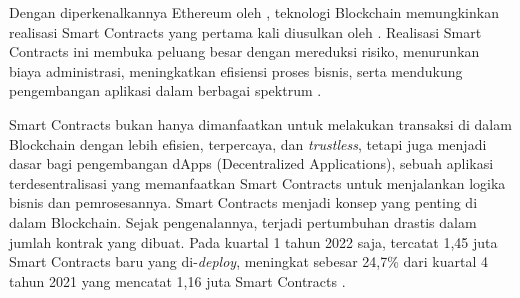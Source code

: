 Dengan diperkenalkannya Ethereum oleh \cite{buterin2013ethereum}, teknologi Blockchain memungkinkan realisasi Smart Contracts yang pertama kali diusulkan oleh \cite{szabo1997formalizing}. Realisasi Smart Contracts ini membuka peluang besar dengan mereduksi risiko, menurunkan biaya administrasi, meningkatkan efisiensi proses bisnis, serta mendukung pengembangan aplikasi dalam berbagai spektrum \parencite{zheng2020overview}.

Smart Contracts bukan hanya dimanfaatkan untuk melakukan transaksi di dalam Blockchain dengan lebih efisien, terpercaya, dan \textit{trustless}, tetapi juga menjadi dasar bagi pengembangan dApps (Decentralized Applications), sebuah aplikasi terdesentralisasi yang memanfaatkan Smart Contracts untuk menjalankan logika bisnis dan pemrosesannya. Smart Contracts menjadi konsep yang penting di dalam Blockchain. Sejak pengenalannya, terjadi pertumbuhan drastis dalam jumlah kontrak yang dibuat. Pada kuartal 1 tahun 2022 saja, tercatat 1,45 juta Smart Contracts baru yang di-\textit{deploy}, meningkat sebesar 24,7\% dari kuartal 4 tahun 2021 yang mencatat 1,16 juta Smart Contracts \parencite{alchemy_ethereum_statistics}.

